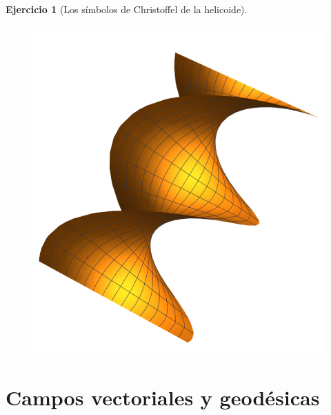 \documentclass[spanish]{book}
\theoremstyle{definition}
\newtheorem*{ejer}{Ejercicio}
\begin{document}
\begin{ejer}[Los símbolos de Christoffel de la helicoide]
	\begin{figure}[H]
		\centering
		\includegraphics[width=0.4\linewidth]{gauss5}
	\end{figure}
\end{ejer}

\section{Campos vectoriales y geodésicas}
\end{document}
